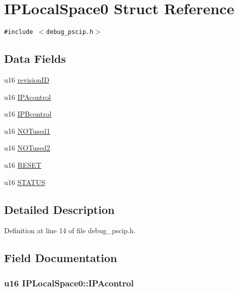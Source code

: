 \hypertarget{struct_i_p_local_space0}{
\section{IPLocalSpace0 Struct Reference}
\label{struct_i_p_local_space0}
}
{\tt \#include $<$debug\_\-pscip.h$>$}

\subsection*{Data Fields}
\begin{CompactItemize}
\item 
u16 \hyperlink{struct_i_p_local_space0_d01c22f939b8e2b81582afcab4856e6c}{revisionID}
\item 
u16 \hyperlink{struct_i_p_local_space0_dffafedbe0d064e6578a90db09909986}{IPAcontrol}
\item 
u16 \hyperlink{struct_i_p_local_space0_ff21316bc78314d0cb5268813731e848}{IPBcontrol}
\item 
u16 \hyperlink{struct_i_p_local_space0_5dc9959fb4d52e5a232cbbc8e25b76d1}{NOTused1}
\item 
u16 \hyperlink{struct_i_p_local_space0_0b2e97e91a1b29e824d8a44a391d52b0}{NOTused2}
\item 
u16 \hyperlink{struct_i_p_local_space0_5cc8b5858012191071e1ec74286067c7}{RESET}
\item 
u16 \hyperlink{struct_i_p_local_space0_95703e2f24619e296ac6b2a1f49f43e4}{STATUS}
\end{CompactItemize}


\subsection{Detailed Description}


Definition at line 14 of file debug\_\-pscip.h.

\subsection{Field Documentation}
\hypertarget{struct_i_p_local_space0_dffafedbe0d064e6578a90db09909986}{
\subsubsection[{IPAcontrol}]{\setlength{\rightskip}{0pt plus 5cm}u16 {\bf IPLocalSpace0::IPAcontrol}}}
\label{struct_i_p_local_space0_dffafedbe0d064e6578a90db09909986}




